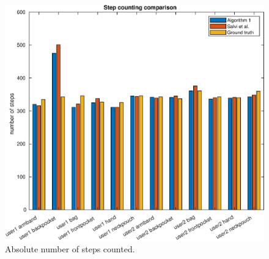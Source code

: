 	\begin{figure}[htbp]
		\centering
		\includegraphics[width=0.7\linewidth]{images/20201112_1347_step_counting_comparison_1}
		\setlength{\belowcaptionskip}{-20pt}
		\caption{Absolute number of steps counted.}
		\label{fig:sd_abs_comparison}
	\end{figure}
\restoregeometry

